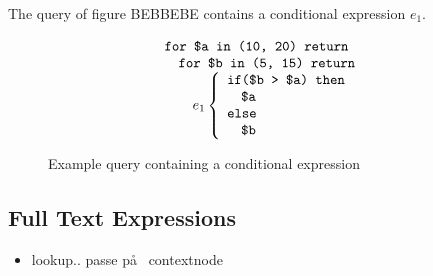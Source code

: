\begin{myExample}
The query of figure BEBBEBE contains a conditional expression $e_1$.
\begin{figure}[h]
\centering
\begin{equation*}
\begin{array}{l}
\mbox{\texttt{for \$a in (10, 20) return}} \\ \quad
\mbox{\texttt{for \$b in (5, 15) return}} \\ \quad \quad
e_1 \left\{\begin{array}{l}
           \mbox{\texttt{if(\$b > \$a) then}} \\ \quad
           \mbox{\texttt{\$a}} \\ 
           \mbox{\texttt{else}} \\ \quad
           \mbox{\texttt{\$b}}
           \end{array}\right.
\end{array}
\end{equation*}
\caption{Example query containing a conditional expression \label{fig:trans:TD:condQue}}
\end{figure}


\end{myExample}



\subsection{Full Text Expressions}
\label{sect:trans:TD:fulltext}
\begin{itemize}
  \item lookup.. passe p\aa~ contextnode
\end{itemize}
